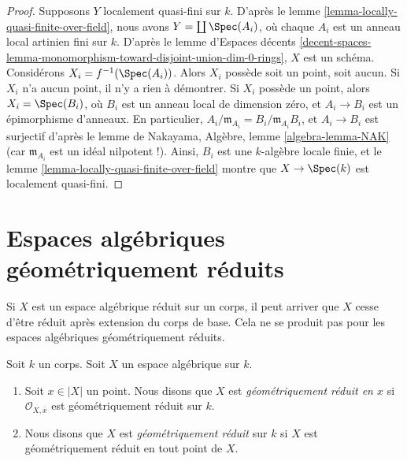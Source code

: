 \begin{proof}
Supposons $Y$ localement quasi-fini sur $k$. D'après le
lemme \ref{lemma-locally-quasi-finite-over-field},
nous avons $Y = \coprod \Spec(A_i)$, où chaque $A_i$ est un
anneau local artinien fini sur $k$. D'après le
lemme d'Espaces décents
\ref{decent-spaces-lemma-monomorphism-toward-disjoint-union-dim-0-rings},
$X$ est un schéma. Considérons $X_i = f^{-1}(\Spec(A_i))$.
Alors $X_i$ possède soit un point, soit aucun. Si $X_i$ n'a aucun point, il
n'y a rien à démontrer. Si $X_i$ possède un point, alors
$X_i = \Spec(B_i)$, où $B_i$ est un anneau local de dimension zéro,
et $A_i \to B_i$ est un épimorphisme d'anneaux. En particulier,
$A_i/\mathfrak m_{A_i} = B_i/\mathfrak m_{A_i}B_i$, et
$A_i \to B_i$ est surjectif d'après le lemme de Nakayama,
Algèbre, lemme \ref{algebra-lemma-NAK}
(car $\mathfrak m_{A_i}$ est un idéal nilpotent !).
Ainsi, $B_i$ est une $k$-algèbre locale finie, et le
lemme \ref{lemma-locally-quasi-finite-over-field}
montre que $X \to \Spec(k)$ est localement quasi-fini.
\end{proof}











\section{Espaces algébriques géométriquement réduits}
\label{section-geometrically-reduced}

\noindent
Si $X$ est un espace algébrique réduit sur un corps, il peut arriver que $X$
cesse d'être réduit après extension du corps de base. Cela ne se produit pas
pour les espaces algébriques géométriquement réduits.

\begin{definition}
\label{definition-geometrically-reduced}
Soit $k$ un corps.
Soit $X$ un espace algébrique sur $k$.
\begin{enumerate}
\item Soit $x \in |X|$ un point. Nous disons que $X$ est
{\it géométriquement réduit en $x$} si $\mathcal{O}_{X, \overline{x}}$
est géométriquement réduit sur $k$.
\item Nous disons que $X$ est {\it géométriquement réduit} sur $k$
si $X$ est géométriquement réduit en tout point de $X$.
\end{enumerate}
\end{definition}

